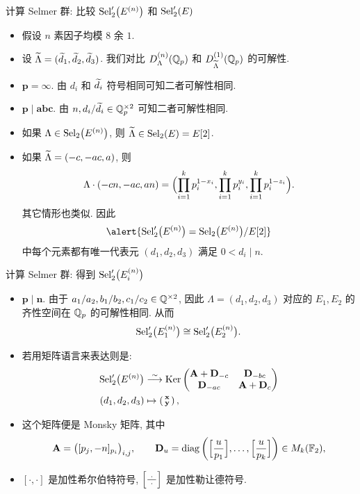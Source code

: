 \documentclass[handout,aspectratio=1610]{ctexbeamer}
\begin{document}
\begin{frame}{计算 Selmer 群: 比较 ${\mathrm{Sel}}_2'\bigl(E^{(n)}\bigr)$ 和 ${\mathrm{Sel}}_2'(E)$}
\begin{itemize}
\item 假设 $n$ 素因子均模 $8$ 余 $1$.
\item 设 $\widetilde\Lambda=(\widetilde d_1,\widetilde d_2,\widetilde d_3)$.
我们对比 $D_\Lambda^{(n)}({\mathbb{Q}}_p)$ 和 $D_{\widetilde\Lambda}^{(1)}({\mathbb{Q}}_p)$ 的可解性.
\item \alert{$\bm{p=\infty}$}. 由 $d_i$ 和 $\widetilde d_i$ 符号相同可知二者可解性相同.
\item \alert{$\bm{p\mid abc}$}. 由 $n,d_i/\widetilde d_i\in{\mathbb{Q}}_p^{\times2}$ 可知二者可解性相同.
\item 如果 $\Lambda\in{\mathrm{Sel}}_2\bigl(E^{(n)}\bigr)$, 则 $\widetilde\Lambda\in {\mathrm{Sel}}_2(E)=E[2]$.
\item 如果 $\widetilde\Lambda=(-c,-ac,a)$, 则
\[\Lambda\cdot(-cn,-ac,an)=\Bigl(\prod_{i=1}^k p_i^{1-x_i},\prod_{i=1}^k p_i^{y_i},\prod_{i=1}^k p_i^{1-z_i}\Bigr).\]
其它情形也类似.
\onslide<+-> 
因此
\[\alert{\Sel_2'\bigl(E^{(n)}\bigr)=\Sel_2\bigl(E^{(n)}\bigr)/E[2]}\]
\alert{中每个元素都有唯一代表元 $(d_1,d_2,d_3)$ 满足 $0<d_i\mid n$}.
\end{itemize}
\end{frame}


\begin{frame}{计算 Selmer 群: 得到 ${\mathrm{Sel}}_2'\bigl(E_i^{(n)}\bigr)$}
\begin{itemize}
\item \alert{$\bm{p\mid n}$}.
\onslide<+-> 
由于 $a_1/a_2,b_1/b_2,c_1/c_2\in {\mathbb{Q}}^{\times2}$, 因此 $\Lambda=(d_1,d_2,d_3)$ 对应的 $E_1,E_2$ 的齐性空间在 ${\mathbb{Q}}_p$ 的可解性相同.
\onslide<+-> 
从而
\[{\mathrm{Sel}}_2'\bigl(E_1^{(n)}\bigr)\cong {\mathrm{Sel}}_2'\bigl(E_2^{(n)}\bigr).\]
\item 若用矩阵语言来表达则是:
\[\begin{split}
{\mathrm{Sel}}_2'\bigl(E^{(n)}\bigr)&\stackrel{\sim}{\longrightarrow} \operatorname{Ker}\begin{pmatrix}
{\mathbf{A}}+{\mathbf{D}}_{-c}&{\mathbf{D}}_{-bc}\\{\mathbf{D}}_{-ac}&{\mathbf{A}}+{\mathbf{D}}_c
\end{pmatrix}\\
(d_1,d_2,d_3)&\mapsto \left(\begin{smallmatrix}{\mathbf{x}}\\{\mathbf{y}}\end{smallmatrix}\right),\end{split}\]
\item 这个矩阵便是 Monsky 矩阵, 其中
\[{\mathbf{A}}=\bigl([p_j,-n]_{p_i}\bigr)_{i,j},\qquad
{\mathbf{D}}_u={\mathrm{diag}}\left(\Bigl[\frac{{u}}{p_1}\Bigr],\dots,\Bigl[\frac{{u}}{p_k}\Bigr]\right)\in M_k({\mathbb{F}}_2),\]
\vspace{-\baselineskip}
\item $[\cdot,\cdot]$ 是加性希尔伯特符号, $\Bigl[\frac{{~\cdot~}}{\cdot}\Bigr]$ 是加性勒让德符号.
\end{itemize}
\end{frame}
\end{document}
